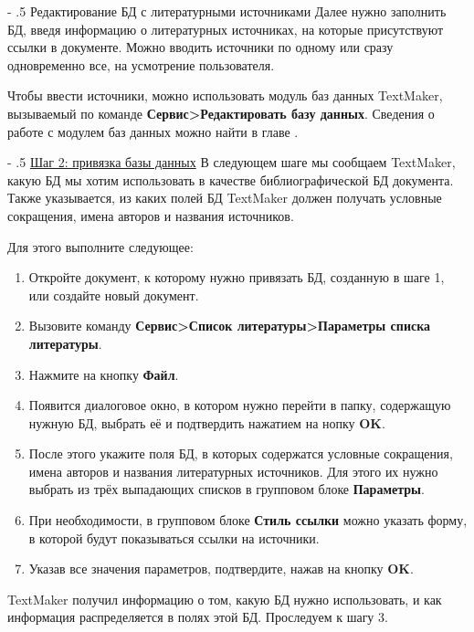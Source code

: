 ﻿\documentclass[a4paper,10pt]{article}
\makeatletter
\renewcommand\paragraph{%
   \@startsection{paragraph}{4}{0mm}%
      {-\baselineskip}%
      {.5\baselineskip}%
      {\normalfont\normalsize\bfseries}}
\makeatother
\begin{document}
\paragraph{Редактирование БД с литературными источниками}
Далее нужно заполнить БД, введя информацию о литературных источниках, на которые присутствуют ссылки в документе. Можно вводить источники по одному или сразу одновременно все, на усмотрение пользователя.

Чтобы ввести источники, можно использовать модуль баз данных TextMaker, вызываемый по команде \textbf{Сервис>Редактировать базу данных}. Сведения о работе с модулем баз данных можно найти в главе .

\paragraph{\underline{Шаг 2: привязка базы данных}}
В следующем шаге мы сообщаем TextMaker, какую БД мы хотим использовать в качестве библиографической БД документа. Также указывается, из каких полей БД TextMaker должен получать условные сокращения, имена авторов и названия источников.

Для этого выполните следующее:

\begin{enumerate}
 \item Откройте документ, к которому нужно привязать БД, созданную в шаге 1, или создайте новый документ.
 \item Вызовите команду \textbf{Сервис>Список литературы>Параметры списка литературы}.
 \item Нажмите на кнопку \textbf{Файл}.
 \item Появится диалоговое окно, в котором нужно перейти в папку, содержащую нужную БД, выбрать её и подтвердить нажатием на нопку \textbf{OK}.
 \item После этого укажите поля БД, в которых содержатся условные сокращения, имена авторов и названия литературных источников. Для этого их нужно выбрать из трёх выпадающих списков в групповом блоке \textbf{Параметры}.
 \item При необходимости, в групповом блоке \textbf{Стиль ссылки} можно указать форму, в которой будут показываться ссылки на источники.
 \item Указав все значения параметров, подтвердите, нажав на кнопку \textbf{OK}.
\end{enumerate}

TextMaker получил  информацию о том, какую БД нужно использовать, и как информация распределяется в полях этой БД. Проследуем к шагу 3.
\end{document}
